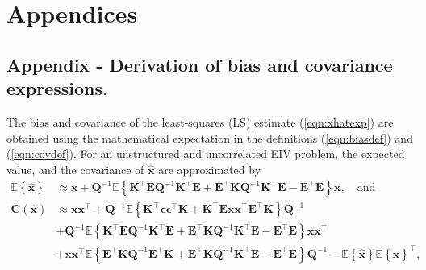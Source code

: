\glsresetall

\chapter{Appendices }\label{chap:Appendices}
\vfill{} 


\section{Appendix - Derivation of bias and covariance expressions.  \label{appendix:biascovSEIV}}

The bias and covariance of the least-squares (LS) estimate (\ref{eqn:xhatexp}) are obtained using the mathematical expectation in the definitions (\ref{eqn:biasdef}) and (\ref{eqn:covdef}).
For an unstructured and uncorrelated EIV problem, the expected value, and the covariance of $\widehat{\mathbf{x}}$ are approximated by
\begin{equation} \begin{aligned} \mathbb{E} \left\{ \widehat{\mathbf{x}} \right\} & \approx \mathbf{x}  + \mathbf{Q}^{-1} \mathbb{E} \left\{ \mathbf{K}^\top \mathbf{E} \mathbf{Q}^{-1} \mathbf{K}^\top \mathbf{E} + \mathbf{E}^\top \mathbf{K} \mathbf{Q}^{-1} \mathbf{K}^\top \mathbf{E} - \mathbf{E}^\top \mathbf{E}  \right\} \mathbf{x}, \quad \text{and}  \\ 
\mathbf{C} \left( \widehat{\mathbf{x}} \right)  & \approx \mathbf{x} \mathbf{x}^\top + \mathbf{Q}^{-1} \mathbb{E} \left\{ \mathbf{K}^\top \bm{\epsilon} \bm{\epsilon}^\top \mathbf{K} + \mathbf{K}^\top \mathbf{E} \mathbf{x} \mathbf{x}^\top \mathbf{E}^\top \mathbf{K} \right\} \mathbf{Q}^{-1} \\ 
& + \mathbf{Q}^{-1} \mathbb{E} \left\{ \mathbf{K}^\top \mathbf{E} \mathbf{Q}^{-1} \mathbf{K}^\top \mathbf{E} + \mathbf{E}^\top \mathbf{K} \mathbf{Q}^{-1} \mathbf{K}^\top \mathbf{E} - \mathbf{E}^\top \mathbf{E} \right\} \mathbf{x} \mathbf{x}^\top \\
& + \mathbf{x} \mathbf{x}^\top \mathbb{E} \left\{ \mathbf{E}^\top \mathbf{K} \mathbf{Q}^{-1} \mathbf{E}^\top \mathbf{K} + \mathbf{E}^\top \mathbf{K} \mathbf{Q}^{-1} \mathbf{K}^\top \mathbf{E} - \mathbf{E}^\top \mathbf{E} \right\} \mathbf{Q}^{-1} - \mathbb{E} \left\{ \widehat{\mathbf{x}} \right\} \mathbb{E} \left\{ \widehat{\mathbf{x}} \right\}^\top , \label{eqn:EC_Eu} \end{aligned} \end{equation} 
